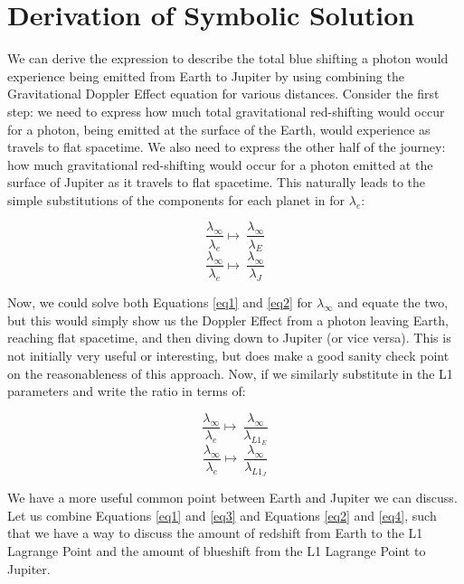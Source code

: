 \documentclass[]{report}
\begin{document}
    \section{Derivation of Symbolic Solution}
      We can derive the expression to describe the total blue shifting a photon would experience being emitted from Earth to Jupiter by using combining the Gravitational Doppler Effect equation for various distances. Consider the first step: we need to express how much total gravitational red-shifting would occur for a photon, being emitted at the surface of the Earth, would experience as travels to flat spacetime. We also need to express the other half of the journey: how much gravitational red-shifting would occur for a photon emitted at the surface of Jupiter as it travels to flat spacetime. This naturally leads to the simple substitutions of the components for each planet in for $\lambda_e$:

      \begin{equation} \label{eq1}
        \frac{\lambda_\infty}{\lambda_e} \mapsto \ \frac{\lambda_\infty}{\lambda_E}
        \end{equation}
      \begin{equation} \label{eq2}
        \frac{\lambda_\infty}{\lambda_e} \mapsto \ \frac{\lambda_\infty}{\lambda_J}
        \end{equation}

      Now, we could solve both Equations \ref{eq1} and \ref{eq2} for $\lambda_\infty$ and equate the two, but this would simply show us the Doppler Effect from a photon leaving Earth, reaching flat spacetime, and then diving down to Jupiter (or vice versa). This is not initially very useful or interesting, but does make a good sanity check point on the reasonableness of this approach. Now, if we similarly substitute in the L1 parameters and write the ratio in terms of:

      \begin{equation} \label{eq3}
        \frac{\lambda_\infty}{\lambda_e} \mapsto \ \frac{\lambda_\infty}{\lambda_{L1_E}}
        \end{equation}
      \begin{equation} \label{eq4}
        \frac{\lambda_\infty}{\lambda_e} \mapsto \ \frac{\lambda_\infty}{\lambda_{L1_J}}
        \end{equation}

      We have a more useful common point between Earth and Jupiter we can discuss. Let us combine Equations \ref{eq1} and \ref{eq3} and Equations \ref{eq2} and \ref{eq4}, such that we have a way to discuss the amount of redshift from Earth to the L1 Lagrange Point and the amount of blueshift from the L1 Lagrange Point to Jupiter.
\end{document}
